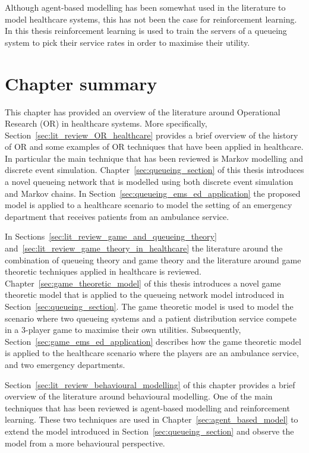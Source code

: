 Although agent-based modelling has been somewhat used in the literature to
model healthcare systems, this has not been the case for reinforcement
learning.
In this thesis reinforcement learning is used to train the servers of a
queueing system to pick their service rates in order to maximise their
utility.

\section{Chapter summary}

This chapter has provided an overview of the literature around Operational
Research (OR) in healthcare systems.
More specifically, Section~\ref{sec:lit_review_OR_healthcare} provides a
brief overview of the history of OR and some examples of OR techniques that
have been applied in healthcare.
In particular the main technique that has been reviewed is Markov modelling
and discrete event simulation.
Chapter~\ref{sec:queueing_section} of this thesis introduces a novel queueing
network that is modelled using both discrete event simulation and Markov
chains.
In Section~\ref{sec:queueing_ems_ed_application} the proposed model is applied
to a healthcare scenario to model the setting of an emergency department that
receives patients from an ambulance service.

In Sections~\ref{sec:lit_review_game_and_queueing_theory}
and~\ref{sec:lit_review_game_theory_in_healthcare} the literature around
the combination of queueing theory and game theory and the literature around
game theoretic techniques applied in healthcare is reviewed.
Chapter~\ref{sec:game_theoretic_model} of this thesis introduces a novel
game theoretic model that is applied to the queueing network model introduced
in Section~\ref{sec:queueing_section}.
The game theoretic model is used to model the scenario where two queueing
systems and a patient distribution service compete in a 3-player game to
maximise their own utilities.
Subsequently, Section~\ref{sec:game_ems_ed_application} describes how the
game theoretic model is applied to the healthcare scenario where the players
are an ambulance service, and two emergency departments.

Section~\ref{sec:lit_review_behavioural_modelling} of this chapter
provides a brief overview of the literature around behavioural modelling.
One of the main techniques that has been reviewed is agent-based modelling and
reinforcement learning.
These two techniques are used in Chapter~\ref{sec:agent_based_model} to
extend the model introduced in Section~\ref{sec:queueing_section} and
observe the model from a more behavioural perspective.

